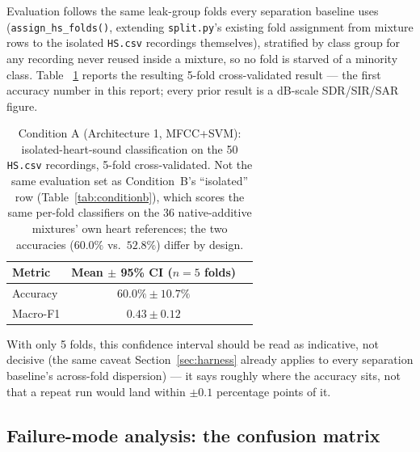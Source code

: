 \documentclass[11pt]{article}
\begin{document}
Evaluation follows the same leak-group folds every separation baseline
uses (\texttt{assign\_hs\_folds()}, extending \texttt{split.py}'s existing
fold assignment from mixture rows to the isolated \texttt{HS.csv}
recordings themselves), stratified by class group for any recording never
reused inside a mixture, so no fold is starved of a minority class. Table~
\ref{tab:conditionAfold} reports the resulting 5-fold cross-validated
result --- the first accuracy number in this report; every prior result is
a dB-scale SDR/SIR/SAR figure.

\begin{table}[H]
\centering
\caption{Condition A (Architecture 1, MFCC+SVM): isolated-heart-sound classification on the 50 \texttt{HS.csv} recordings, 5-fold cross-validated. Not the same evaluation set as Condition~B's ``isolated'' row (Table~\ref{tab:conditionb}), which scores the same per-fold classifiers on the 36 native-additive mixtures' own heart references; the two accuracies ($60.0\%$ vs.\ $52.8\%$) differ by design.}
\label{tab:conditionAfold}
\begin{tabular}{@{}lcc@{}}
\toprule
Metric & Mean $\pm$ 95\% CI ($n{=}5$ folds) & \\
\midrule
Accuracy & $60.0\% \pm 10.7\%$ & \\
Macro-F1 & $0.43 \pm 0.12$ & \\
\bottomrule
\end{tabular}
\end{table}

With only 5 folds, this confidence interval should be read as indicative,
not decisive (the same caveat Section~\ref{sec:harness} already applies to
every separation baseline's across-fold dispersion) --- it says roughly
where the accuracy sits, not that a repeat run would land within
$\pm 0.1$ percentage points of it.

\subsection{Failure-mode analysis: the confusion matrix}
\label{sec:classifier-failure}
\end{document}
